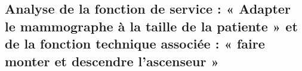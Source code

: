%
%
%
%
%
%
%
%
%
%
%

\subsection*{Analyse de la fonction de service : « Adapter le
mammographe à la taille de la patiente » et de la fonction
technique associée : « faire monter et descendre
l’ascenseur »}
\ifprof
\else



